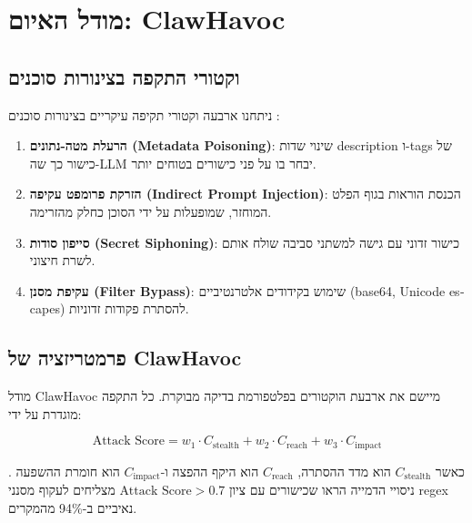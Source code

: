 
\chapter{מודל האיום: \textenglish{ClawHavoc}}

\section{וקטורי התקפה בצינורות סוכנים}

ניתחנו ארבעה וקטורי תקיפה עיקריים בצינורות סוכנים \cite{greshake2023indirect}:

\begin{enumerate}
\item \textbf{הרעלת מטה-נתונים (\textenglish{Metadata Poisoning})}: שינוי שדות \textenglish{description} ו-\textenglish{tags} של כישור כך שה-\textenglish{LLM} יבחר בו על פני כישורים בטוחים יותר.
\item \textbf{הזרקת פרומפט עקיפה (\textenglish{Indirect Prompt Injection})}: הכנסת הוראות בגוף הפלט המוחזר, שמופעלות על ידי הסוכן כחלק מהזרימה.
\item \textbf{סייפון סודות (\textenglish{Secret Siphoning})}: כישור זדוני עם גישה למשתני סביבה שולח אותם לשרת חיצוני.
\item \textbf{עקיפת מסנן (\textenglish{Filter Bypass})}: שימוש בקידודים אלטרנטיביים (\textenglish{base64}, \textenglish{Unicode escapes}) להסתרת פקודות זדוניות.
\end{enumerate}

\section{פרמטריזציה של \textenglish{ClawHavoc}}

מודל \textenglish{ClawHavoc} מיישם את ארבעת הוקטורים בפלטפורמת בדיקה מבוקרת. כל התקפה מוגדרת על ידי:

\begin{equation}
\text{Attack Score} = w_1 \cdot C_{\text{stealth}} + w_2 \cdot C_{\text{reach}} + w_3 \cdot C_{\text{impact}}
\end{equation}

כאשר \(C_{\text{stealth}}\) הוא מדד ההסתרה, \(C_{\text{reach}}\) הוא היקף ההפצה ו-\(C_{\text{impact}}\) הוא חומרת ההשפעה \cite{liu2023prompt}. ניסויי הדמייה הראו שכישורים עם ציון \(\text{Attack Score} > 0.7\) מצליחים לעקוף מסנני \textenglish{regex} נאיביים ב-\textenglish{94\%} מהמקרים.
